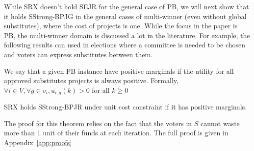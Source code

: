 \documentclass[runningheads]{llncs}
\begin{document}
    




While SRX doesn't hold SEJR for the general case of PB, we will next show that it holds SStrong-BPJG in the general cases of multi-winner (even without global substitutes), where the cost of projects is one. While the focus in the paper is PB, the multi-winner domain is discussed a lot in the literature. For example, the following results can used in elections where a committee is needed to be chosen and voters can express substitutes between them.

\begin{definition} We say that a given PB instance have positive marginals if the utility for all approved substitutes projects is always positive. Formally, $\forall i\in V, \forall g\in v_i, u_{i,g}(k)>0$ for all $k\geq 0$
\end{definition}

\begin{theorem}\label{theorem:unit}
SRX holds SStrong-BPJR under unit cost constraint if it has positive marginals.
\end{theorem}

The proof for this theorem relies on the fact that the voters in $S$ cannot waste more than 1  unit of their funds at each iteration. The full proof is given  in Appendix~\ref{app:proofs}
\end{document}
